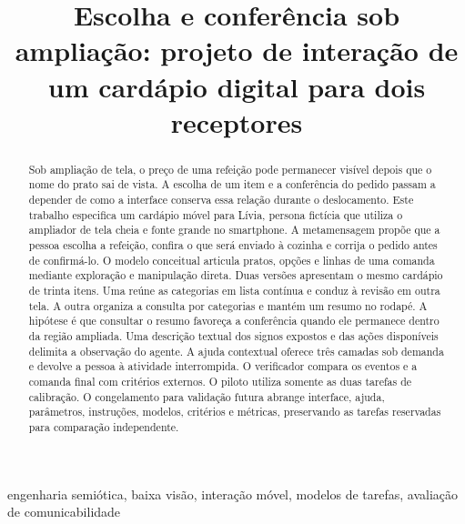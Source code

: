 
\title{Escolha e conferência sob ampliação: projeto de interação de um cardápio digital para dois receptores}
\author{\groupauthors}
\maketitle
\begin{abstract}Sob ampliação de tela, o preço de uma refeição pode permanecer visível depois que o nome do prato sai de vista. A escolha de um item e a conferência do pedido passam a depender de como a interface conserva essa relação durante o deslocamento. Este trabalho especifica um cardápio móvel para Lívia, persona fictícia que utiliza o ampliador de tela cheia e fonte grande no smartphone. A metamensagem propõe que a pessoa escolha a refeição, confira o que será enviado à cozinha e corrija o pedido antes de confirmá-lo. O modelo conceitual articula pratos, opções e linhas de uma comanda mediante exploração e manipulação direta. Duas versões apresentam o mesmo cardápio de trinta itens. Uma reúne as categorias em lista contínua e conduz à revisão em outra tela. A outra organiza a consulta por categorias e mantém um resumo no rodapé. A hipótese é que consultar o resumo favoreça a conferência quando ele permanece dentro da região ampliada. Uma descrição textual dos signos expostos e das ações disponíveis delimita a observação do agente. A ajuda contextual oferece três camadas sob demanda e devolve a pessoa à atividade interrompida. O verificador compara os eventos e a comanda final com critérios externos. O piloto utiliza somente as duas tarefas de calibração. O congelamento para validação futura abrange interface, ajuda, parâmetros, instruções, modelos, critérios e métricas, preservando as tarefas reservadas para comparação independente.\end{abstract}
\begin{IEEEkeywords}engenharia semiótica, baixa visão, interação móvel, modelos de tarefas, avaliação de comunicabilidade\end{IEEEkeywords}

